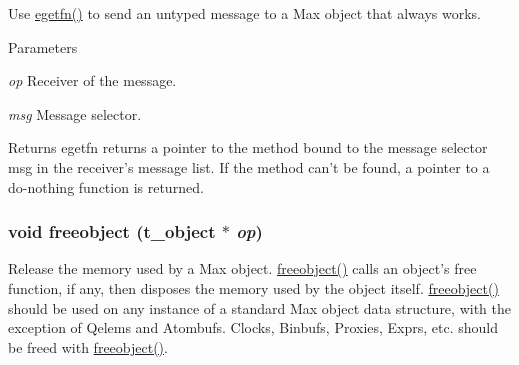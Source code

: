 Use \hyperlink{group__class__old_ga96dfd8b6f4c7111c34f1c2103fbdcdf0}{egetfn()} to send an untyped message to a Max object that always works. 
\begin{DoxyParams}{Parameters}
\item[{\em op}]Receiver of the message. \item[{\em msg}]Message selector. \end{DoxyParams}
\begin{DoxyReturn}{Returns}
egetfn returns a pointer to the method bound to the message selector msg in the receiver’s message list. If the method can’t be found, a pointer to a do-\/nothing function is returned. 
\end{DoxyReturn}
\hypertarget{group__class__old_gadf30646e52376a37b93cc20efac65636}{
\subsubsection[{freeobject}]{\setlength{\rightskip}{0pt plus 5cm}void freeobject ({\bf t\_\-object} $\ast$ {\em op})}}
\label{group__class__old_gadf30646e52376a37b93cc20efac65636}


Release the memory used by a Max object. \hyperlink{group__class__old_gadf30646e52376a37b93cc20efac65636}{freeobject()} calls an object’s free function, if any, then disposes the memory used by the object itself. \hyperlink{group__class__old_gadf30646e52376a37b93cc20efac65636}{freeobject()} should be used on any instance of a standard Max object data structure, with the exception of Qelems and Atombufs. Clocks, Binbufs, Proxies, Exprs, etc. should be freed with \hyperlink{group__class__old_gadf30646e52376a37b93cc20efac65636}{freeobject()}.


